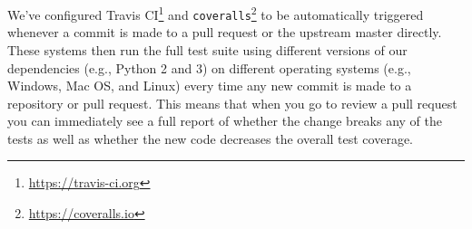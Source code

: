 %
%





We've configured Travis CI\footnote{\url{https://travis-ci.org}} and
\texttt{coveralls}\footnote{\url{https://coveralls.io}} to be automatically
triggered whenever a commit is made to a pull request or the upstream
master directly.  These systems then run the full test suite 
using different versions of our dependencies (e.g., Python 2 and 3) on
different operating systems (e.g., Windows, Mac OS, and Linux) every time any
new commit is made to a repository or pull request.
This means that when you go to review a pull request you can immediately see
a full report of whether the change breaks any of the tests as well as whether
the new code decreases the overall test coverage.

